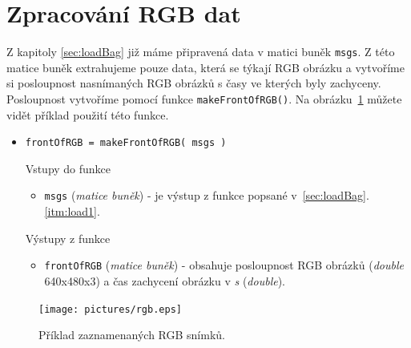 \documentclass[10pt,a4paper,titlepage,oneside]{report}
\begin{document}
\section{Zpracování RGB dat}
\label{sec:procRgb}
Z kapitoly \ref{sec:loadBag} již máme připravená data v matici buněk \verb|msgs|. Z této matice buněk extrahujeme pouze data, která se týkají RGB obrázku a vytvoříme si posloupnost nasnímaných RGB obrázků s časy ve kterých byly zachyceny. Posloupnost vytvoříme pomocí funkce \verb|makeFrontOfRGB()|. Na obrázku~\ref{fig:rgbPic} můžete vidět příklad použití této funkce.
\begin{itemize}
  	\item \verb|frontOfRGB = makeFrontOfRGB( msgs )|

    		Vstupy do funkce
        		\begin{itemize}
  			\item \verb|msgs| (\textit{matice buněk}) - je výstup z funkce popsané v~\ref{sec:loadBag}.\ref{itm:load1}.
    			\end{itemize}
    		Výstupy z funkce
        		\begin{itemize}
  			\item \verb|frontOfRGB| (\textit{matice buněk}) - obsahuje posloupnost RGB obrázků (\textit{double} 640x480x3) a čas zachycení obrázku v \textit{s} (\textit{double}). 
    			\end{itemize}
    \end{itemize}

\begin{figure}[H]
	\centering  	
  	\texttt{[image: pictures/rgb.eps]}
  	\caption[]{Příklad zaznamenaných RGB snímků.  	
  	}
  	\label{fig:rgbPic}
\end{figure}
\end{document}
